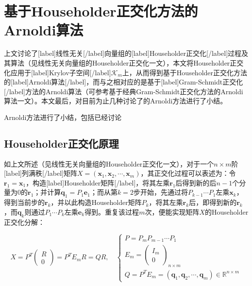 \documentclass[UTF8,nofonts]{ctexart}
\begin{document}

\section*{基于Householder正交化方法的Arnoldi算法}


上文讨论了[label]线性无关[/label]向量组的[label]Householder正交化[/label]过程及其算法（见线性无关向量组的Householder正交化一文），本文将Householder正交化应用于[label]Krylov子空间[/label]$\mathcal{K}_m$上，从而得到基于Householder正交化方法的[label]Arnoldi算法[/label]，而与之相对应的是基于[label]Gram-Schmidt正交化[/label]方法的Arnoldi算法（可参考基于经典Gram-Schmidt正交化方法的Arnoldi算法一文）。本文最后，对目前为止几种讨论了的Arnoldi方法进行了小结。

Arnoldi方法进行了小结，包括已经讨论

\subsection*{Householder正交化原理}

如上文所述（见线性无关向量组的Householder正交化一文），对于一个$n \times m$阶[label]列满秩[/label]矩阵$X=(\boldsymbol{x}_1,\boldsymbol{x}_2,\cdots,\boldsymbol{x}_m)$，其正交化过程可以表述为：令$\boldsymbol{r}_1=\boldsymbol{x}_1$，构造[label]Householder矩阵[/label]，将其左乘$\boldsymbol{r}_1$后得到新的后$n-1$个分量为$0$的$\boldsymbol{r}_1$；并计算$\boldsymbol{q}_1=P_1\boldsymbol{e}_1$；而从第$k=2$步开始，先通过将$P_{k-1}\cdots P_1$左乘$\boldsymbol{x}_k$，得到当前步的$\boldsymbol{r}_k$，并以此构造Householder矩阵$P_k$，将其左乘$\boldsymbol{r}_k$后，即得到新的$\boldsymbol{r}_k$，而$\boldsymbol{q}_k$则通过$P_1\cdots P_k$左乘$\boldsymbol{e}_k$得到。重复该过程$m$次，便能实现矩阵$X$的Householder正交化分解：

\[
X=P^T\begin{pmatrix}R\\0\end{pmatrix}=P^TE_mR=QR,\quad
\begin{cases}
P=P_mP_{m-1}\cdots P_1 \\
E_m=\begin{pmatrix}I_m\\0\end{pmatrix}_{n \times m} \\
Q=P^TE_m=(\boldsymbol{q}_1,\boldsymbol{q}_2,\cdots,\boldsymbol{q}_m)\in\mathbb{R}^{n \times m}
\end{cases}
\]
\end{document}
